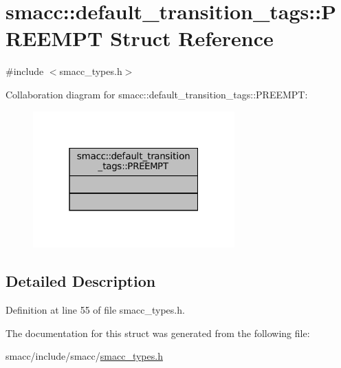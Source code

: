 \hypertarget{structsmacc_1_1default__transition__tags_1_1PREEMPT}{}\section{smacc\+:\+:default\+\_\+transition\+\_\+tags\+:\+:P\+R\+E\+E\+M\+PT Struct Reference}
\label{structsmacc_1_1default__transition__tags_1_1PREEMPT}


{\ttfamily \#include $<$smacc\+\_\+types.\+h$>$}



Collaboration diagram for smacc\+:\+:default\+\_\+transition\+\_\+tags\+:\+:P\+R\+E\+E\+M\+PT\+:
\nopagebreak
\begin{figure}[H]
\begin{center}
\leavevmode
\includegraphics[width=220pt]{structsmacc_1_1default__transition__tags_1_1PREEMPT__coll__graph}
\end{center}
\end{figure}


\subsection{Detailed Description}


Definition at line 55 of file smacc\+\_\+types.\+h.



The documentation for this struct was generated from the following file\+:\begin{DoxyCompactItemize}
\item 
smacc/include/smacc/\hyperlink{smacc__types_8h}{smacc\+\_\+types.\+h}\end{DoxyCompactItemize}
